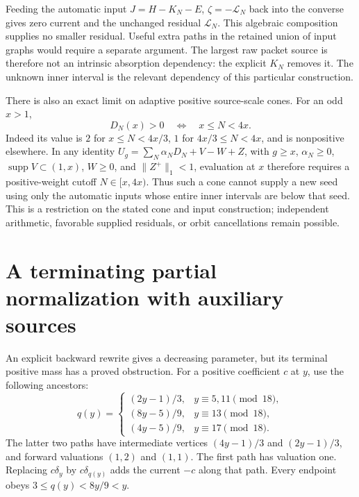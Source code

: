 \documentclass[11pt]{article}
\newcommand{\supp}{\operatorname{supp}}
\begin{document}
Feeding the automatic input $J=H-K_N-E$, $\zeta=-\mathcal L_N$
back into the converse gives zero current and the unchanged residual
$\mathcal L_N$. This algebraic composition supplies no smaller residual.
Useful extra paths in the retained union of input graphs would require
a separate argument.
The largest raw packet source is therefore not an intrinsic absorption
dependency: the explicit $K_N$ removes it. The unknown inner interval
is the relevant dependency of this particular construction.

There is also an exact limit on adaptive positive source-scale cones.
For an odd $x>1$,
\[
 D_N(x)>0\quad\Longleftrightarrow\quad x\le N<4x.
\]
Indeed its value is $2$ for $x\le N<4x/3$, $1$ for
$4x/3\le N<4x$, and is nonpositive elsewhere.
In any identity
$U_g=\sum_N\alpha_ND_N+V-W+Z$, with $g\ge x$,
$\alpha_N\ge0$, $\supp V\subset(1,x)$, $W\ge0$, and
$\|Z^+\|_1<1$, evaluation at $x$ therefore requires a positive-weight
cutoff $N\in[x,4x)$. Thus such a cone cannot supply a new seed using
only the automatic inputs whose entire inner intervals are below that
seed. This is a restriction on the stated cone and input construction;
independent arithmetic, favorable supplied residuals, or orbit
cancellations remain possible.

\section{A terminating partial normalization with auxiliary sources}
An explicit backward rewrite gives a decreasing parameter, but its
terminal positive mass has a proved obstruction.
For a positive coefficient $c$ at $y$, use the following ancestors:
\[
 q(y)=
 \begin{cases}
 (2y-1)/3,&y\equiv5,11\pmod{18},\\
 (8y-5)/9,&y\equiv13\pmod{18},\\
 (4y-5)/9,&y\equiv17\pmod{18}.
 \end{cases}
\]
The latter two paths have intermediate vertices $(4y-1)/3$ and
$(2y-1)/3$, and forward valuations $(1,2)$ and $(1,1)$.
The first path has valuation one. Replacing $c\delta_y$ by
$c\delta_{q(y)}$ adds the current $-c$ along that path.
Every endpoint obeys $3\le q(y)<8y/9<y$.
\end{document}
